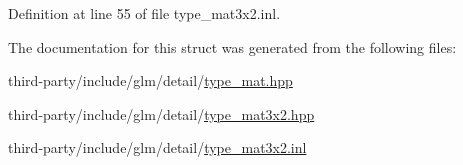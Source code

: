 Definition at line 55 of file type\+\_\+mat3x2.\+inl.



The documentation for this struct was generated from the following files\+:\begin{DoxyCompactItemize}
\item 
third-\/party/include/glm/detail/\hyperlink{type__mat_8hpp}{type\+\_\+mat.\+hpp}\item 
third-\/party/include/glm/detail/\hyperlink{type__mat3x2_8hpp}{type\+\_\+mat3x2.\+hpp}\item 
third-\/party/include/glm/detail/\hyperlink{type__mat3x2_8inl}{type\+\_\+mat3x2.\+inl}\end{DoxyCompactItemize}
